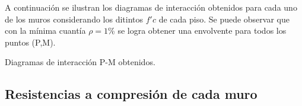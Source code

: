 A continuación se ilustran los diagramas de interacción obtenidos para cada uno de los muros considerando los ditintos $f'c$ de cada piso. Se puede observar que con la mínima cuantía $\rho=1$\% se logra obtener una envolvente para todos los puntos (P,M).

\begin{images}{Diagramas de interacción P-M obtenidos.}
\end{images}

\subsection{Resistencias a compresión de cada muro}

